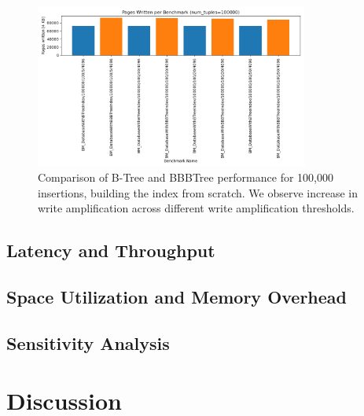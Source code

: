 \begin{figure}[htbp]
  \centering
  \includegraphics[width=0.8\textwidth]{figures/evaluation/100K_tuples_all_wa.png}
  \caption{Comparison of B-Tree and BBBTree performance for 100,000 insertions, building the index from scratch. We observe increase in write amplification across different write amplification thresholds.}
  \label{fig:btree-vs-bbbtree-100000-all-wa}
\end{figure}


\subsection*{Latency and Throughput}

\subsection*{Space Utilization and Memory Overhead}
% 

\subsection*{Sensitivity Analysis}

\section{Discussion}
